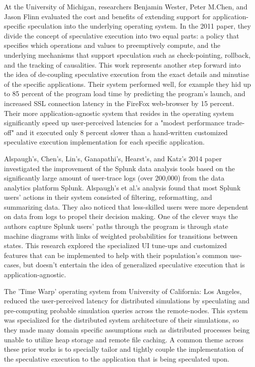 At the University of Michigan, researchers Benjamin Wester, Peter M.Chen, and Jason Flinn evaluated the cost and benefits of extending support for application-specific speculation into the underlying operating system. In the 2011 paper, they divide the concept of speculative execution into two equal parts: a policy that specifies which operations and values to preemptively compute, and the underlying mechanisms that support speculation such as check-pointing, rollback, and the tracking of causalities. This work represents another step forward into the idea of de-coupling speculative execution from the exact details and minutiae of the specific applications. Their system performed well, for example they hid up to 85 percent of the program load time by predicting the program's launch, and increased SSL connection latency in the FireFox web-browser by 15 percent. Their more application-agnostic system that resides in the operating system significantly speed up user-perceived latencies for a "modest performance trade-off" and it executed only 8 percent slower than a hand-written customized speculative execution implementation for each specific application.

Alspaugh's, Chen's, Lin's, Ganapathi's, Hearst's, and Katz's 2014 paper investigated the improvement of the Splunk data analysis tools based on the significantly large amount of user-trace logs (over 200,000) from the data analytics platform Splunk. Alspaugh's et al.'s analysis found that most Splunk users' actions in their system consisted of filtering, reformatting, and summarizing data. They also noticed that less-skilled users were more dependent on data from logs to propel their decision making. One of the clever ways the authors capture Splunk users' paths through the program is through state machine diagrams with links of weighted probabilities for transitions between states. This research explored the specialized UI tune-ups and customized features that can be implemented to help with their population's common use-cases, but doesn't entertain the idea of generalized speculative execution that is application-agnostic.

The 'Time Warp' operating system from University of California: Los Angeles, reduced the user-perceived latency for distributed simulations by speculating and pre-computing probable simulation queries across the remote-nodes. This system was specialized for the distributed system architecture of their simulations, so they made many domain specific assumptions such as distributed processes being unable to utilize heap storage and remote file caching. A common theme across these prior works is to specially tailor and tightly couple the implementation of the speculative execution to the application that is being speculated upon. 


